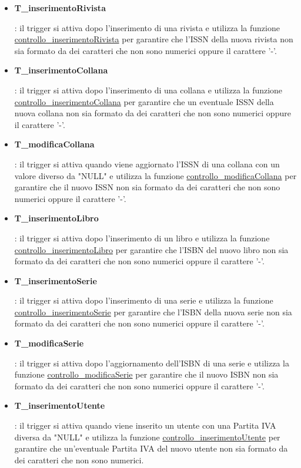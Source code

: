 \documentclass{article}
\begin{document}
\begin{itemize}
   \item \hypertarget{t26}{\textbf{T\_inserimentoRivista}}: il trigger si attiva dopo l'inserimento di una rivista e utilizza la funzione \hyperlink{f25}{controllo\_inserimentoRivista} per garantire che l'ISSN della nuova rivista non sia formato da dei caratteri che non sono numerici oppure il carattere '-'.

   \item \hypertarget{t27}{\textbf{T\_inserimentoCollana}}: il trigger si attiva dopo l'inserimento di una collana e utilizza la funzione \hyperlink{f26}{controllo\_inserimentoCollana} per garantire che un eventuale ISSN della nuova collana non sia formato da dei caratteri che non sono numerici oppure il carattere '-'.

   \item \hypertarget{t28}{\textbf{T\_modificaCollana}}: il trigger si attiva quando viene aggiornato l'ISSN di una collana con un valore diverso da "NULL" e utilizza la funzione \hyperlink{f27}{controllo\_modificaCollana} per garantire che il nuovo ISSN non sia formato da dei caratteri che non sono numerici oppure il carattere '-'.

   \item \hypertarget{t29}{\textbf{T\_inserimentoLibro}}: il trigger si attiva dopo l'inserimento di un libro e utilizza la funzione \hyperlink{f28}{controllo\_inserimentoLibro} per garantire che l'ISBN del nuovo libro non sia formato da dei caratteri che non sono numerici oppure il carattere '-'.

   \item \hypertarget{t30}{\textbf{T\_inserimentoSerie}}: il trigger si attiva dopo l'inserimento di una serie e utilizza la funzione \hyperlink{f29}{controllo\_inserimentoSerie} per garantire che l'ISBN della nuova serie non sia formato da dei caratteri che non sono numerici oppure il carattere '-'.

   \item \hypertarget{t31}{\textbf{T\_modificaSerie}}: il trigger si attiva dopo l'aggiornamento dell'ISBN di una serie e utilizza la funzione \hyperlink{f30}{controllo\_modificaSerie} per garantire che il nuovo ISBN non sia formato da dei caratteri che non sono numerici oppure il carattere '-'.

    \item \hypertarget{t32}{\textbf{T\_inserimentoUtente}}: il trigger si attiva quando viene inserito un utente con una Partita IVA diversa da "NULL" e utilizza la funzione \hyperlink{f31}{controllo\_inserimentoUtente} per garantire che un'eventuale Partita IVA del nuovo utente non sia formato da dei caratteri che non sono numerici.
    
\end{itemize}
\end{document}
